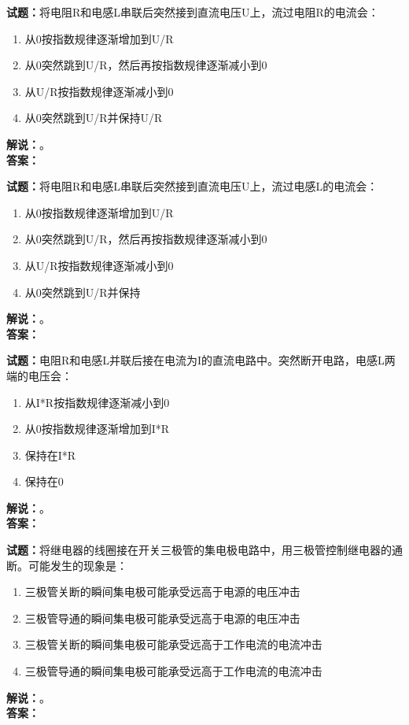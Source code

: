 \documentclass{ctexbook}
\begin{document}
\bigskip

\noindent\textbf{试题：}将电阻R和电感L串联后突然接到直流电压U上，流过电阻R的电流会：
\begin{enumerate}[leftmargin=3em]
  \item 从0按指数规律逐渐增加到U/R
  \item 从0突然跳到U/R，然后再按指数规律逐渐减小到0
  \item 从U/R按指数规律逐渐减小到0
  \item 从0突然跳到U/R并保持U/R
\end{enumerate}
\noindent\textbf{解说：}\textbf{}。\\\noindent\textbf{答案：}

\bigskip

\noindent\textbf{试题：}将电阻R和电感L串联后突然接到直流电压U上，流过电感L的电流会：
\begin{enumerate}[leftmargin=3em]
  \item 从0按指数规律逐渐增加到U/R
  \item 从0突然跳到U/R，然后再按指数规律逐渐减小到0
  \item 从U/R按指数规律逐渐减小到0
  \item 从0突然跳到U/R并保持
\end{enumerate}
\noindent\textbf{解说：}\textbf{}。\\\noindent\textbf{答案：}

\bigskip

\noindent\textbf{试题：}电阻R和电感L并联后接在电流为I的直流电路中。突然断开电路，电感L两端的电压会：
\begin{enumerate}[leftmargin=3em]
  \item 从I*R按指数规律逐渐减小到0
  \item 从0按指数规律逐渐增加到I*R
  \item 保持在I*R
  \item 保持在0
\end{enumerate}
\noindent\textbf{解说：}\textbf{}。\\\noindent\textbf{答案：}

\bigskip

\noindent\textbf{试题：}将继电器的线圈接在开关三极管的集电极电路中，用三极管控制继电器的通断。可能发生的现象是：
\begin{enumerate}[leftmargin=3em]
  \item 三极管关断的瞬间集电极可能承受远高于电源的电压冲击
  \item 三极管导通的瞬间集电极可能承受远高于电源的电压冲击
  \item 三极管关断的瞬间集电极可能承受远高于工作电流的电流冲击
  \item 三极管导通的瞬间集电极可能承受远高于工作电流的电流冲击
\end{enumerate}
\noindent\textbf{解说：}\textbf{}。\\\noindent\textbf{答案：}
\end{document}
